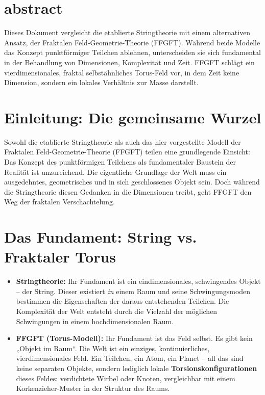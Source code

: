 
	
	\section{abstract}
		Dieses Dokument vergleicht die etablierte Stringtheorie mit einem alternativen Ansatz, der Fraktalen Feld-Geometrie-Theorie (FFGFT). Während beide Modelle das Konzept punktförmiger Teilchen ablehnen, unterscheiden sie sich fundamental in der Behandlung von Dimensionen, Komplexität und Zeit. FFGFT schlägt ein vierdimensionales, fraktal selbstähnliches Torus-Feld vor, in dem Zeit keine Dimension, sondern ein lokales Verhältnis zur Masse darstellt.

	
	\section*{Einleitung: Die gemeinsame Wurzel}
	
	Sowohl die etablierte Stringtheorie als auch das hier vorgestellte Modell der Fraktalen Feld-Geometrie-Theorie (FFGFT) teilen eine grundlegende Einsicht: Das Konzept des punktförmigen Teilchens als fundamentaler Baustein der Realität ist unzureichend. Die eigentliche Grundlage der Welt muss ein ausgedehntes, geometrisches und in sich geschlossenes Objekt sein. Doch während die Stringtheorie diesen Gedanken in die Dimensionen treibt, geht FFGFT den Weg der fraktalen Verschachtelung.
	
	\section{Das Fundament: String vs. Fraktaler Torus}
	
	\begin{itemize}
		\item \textbf{Stringtheorie:} Ihr Fundament ist ein eindimensionales, schwingendes Objekt – der String. Dieser existiert \textit{in} einem Raum und seine Schwingungsmoden bestimmen die Eigenschaften der daraus entstehenden Teilchen. Die Komplexität der Welt entsteht durch die Vielzahl der möglichen Schwingungen in einem hochdimensionalen Raum.
		
		\item \textbf{FFGFT (Torus-Modell):} Ihr Fundament ist das Feld selbst. Es gibt kein „Objekt im Raum“. Die Welt ist ein einziges, kontinuierliches, vierdimensionales Feld. Ein Teilchen, ein Atom, ein Planet – all das sind keine separaten Objekte, sondern lediglich lokale \textbf{Torsionskonfigurationen} dieses Feldes: verdichtete Wirbel oder Knoten, vergleichbar mit einem Korkenzieher-Muster in der Struktur des Raums.
	\end{itemize}
	
